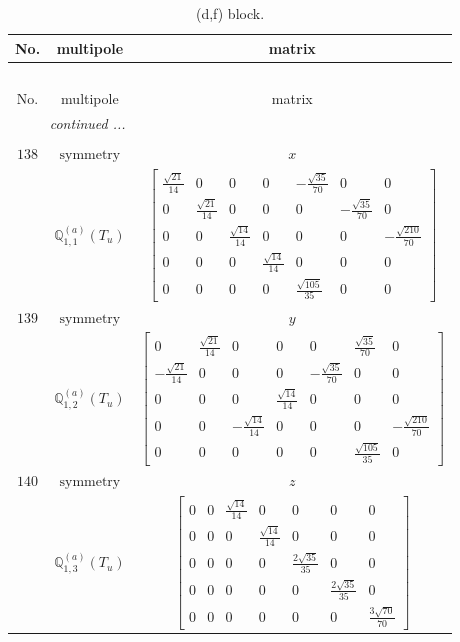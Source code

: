 \documentclass[fleqn,8pt,landscape]{jsarticle}
\begin{document}
\begin{longtable}{ccc}
\caption{(d,f) block.}
 \\
 \hline \hline
No. & multipole & matrix \\ \hline \endfirsthead

\multicolumn{2}{l}{\tablename\ \thetable{}} \\
 \hline \hline
No. & multipole & matrix \\ \hline \endhead

 \hline \hline
\multicolumn{2}{r}{\footnotesize\it continued ...} \\ \endfoot

 \hline \hline
\multicolumn{2}{r}{} \\ \endlastfoot

$ 138 $ & $ \text{symmetry} $ & $ x $ \\
$  $ & $ \mathbb{Q}_{1,1}^{(a)}(T_{u}) $ & $ \begin{bmatrix} \frac{\sqrt{21}}{14} & 0 & 0 & 0 & - \frac{\sqrt{35}}{70} & 0 & 0 \\ 0 & \frac{\sqrt{21}}{14} & 0 & 0 & 0 & - \frac{\sqrt{35}}{70} & 0 \\ 0 & 0 & \frac{\sqrt{14}}{14} & 0 & 0 & 0 & - \frac{\sqrt{210}}{70} \\ 0 & 0 & 0 & \frac{\sqrt{14}}{14} & 0 & 0 & 0 \\ 0 & 0 & 0 & 0 & \frac{\sqrt{105}}{35} & 0 & 0 \end{bmatrix} $ \\ \hline
$ 139 $ & $ \text{symmetry} $ & $ y $ \\
$  $ & $ \mathbb{Q}_{1,2}^{(a)}(T_{u}) $ & $ \begin{bmatrix} 0 & \frac{\sqrt{21}}{14} & 0 & 0 & 0 & \frac{\sqrt{35}}{70} & 0 \\ - \frac{\sqrt{21}}{14} & 0 & 0 & 0 & - \frac{\sqrt{35}}{70} & 0 & 0 \\ 0 & 0 & 0 & \frac{\sqrt{14}}{14} & 0 & 0 & 0 \\ 0 & 0 & - \frac{\sqrt{14}}{14} & 0 & 0 & 0 & - \frac{\sqrt{210}}{70} \\ 0 & 0 & 0 & 0 & 0 & \frac{\sqrt{105}}{35} & 0 \end{bmatrix} $ \\ \hline
$ 140 $ & $ \text{symmetry} $ & $ z $ \\
$  $ & $ \mathbb{Q}_{1,3}^{(a)}(T_{u}) $ & $ \begin{bmatrix} 0 & 0 & \frac{\sqrt{14}}{14} & 0 & 0 & 0 & 0 \\ 0 & 0 & 0 & \frac{\sqrt{14}}{14} & 0 & 0 & 0 \\ 0 & 0 & 0 & 0 & \frac{2 \sqrt{35}}{35} & 0 & 0 \\ 0 & 0 & 0 & 0 & 0 & \frac{2 \sqrt{35}}{35} & 0 \\ 0 & 0 & 0 & 0 & 0 & 0 & \frac{3 \sqrt{70}}{70} \end{bmatrix} $ \\ \hline

\end{longtable}
\end{document}
